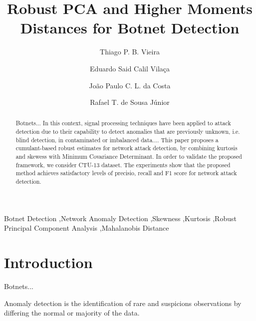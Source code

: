 \documentclass[review]{elsarticle}
\begin{document}
\begin{frontmatter}

\title{Robust PCA and Higher Moments Distances for Botnet Detection}

\author[unbaddress]{Thiago P. B. Vieira}
\author[unbaddress]{Eduardo Said Calil Vilaça}
\author[unbaddress,Ilmenauaddress,Fraunhoferaddress]{João Paulo C. L. da Costa}
\author[unbaddress]{Rafael T. de Sousa Júnior}

\address[unbaddress]{Department of Electrical Engineering, University of Brasilia (UnB), 70910-900, Brasília-DF, Brazil}
\address[Ilmenauaddress]{Institute for Information Technology, Ilmenau University of Technology, Ilmenau, Germany}
\address[Fraunhoferaddress]{Fraunhofer Institute for Integrated Circuits IIS, Erlangen, Germany}


\begin{abstract}
Botnets... In this context, signal processing techniques have been applied to attack detection due to their capability to detect anomalies that are previously unknown, i.e. blind detection, in contaminated or imbalanced data.... This paper proposes a cumulant-based robust estimates for network attack detection, by combining kurtosis and skewess with Minimum Covariance Determinant. In order to validate the proposed framework, we consider CTU-13 dataset. The experiments show that the proposed method achieves satisfactory levels of precisio, recall and F1 score for network attack detection.
\end{abstract}

\begin{keyword}
Botnet Detection \sep Network Anomaly Detection \sep Skewness \sep Kurtosis \sep Robust Principal Component Analysis \sep Mahalanobis Distance
\end{keyword}

\end{frontmatter}

\linenumbers

\section{Introduction}
\label{sec:introduction}

Botnets...

Anomaly detection is the identification of rare and suspicions observations by differing the normal or majority of the data.
\end{document}
